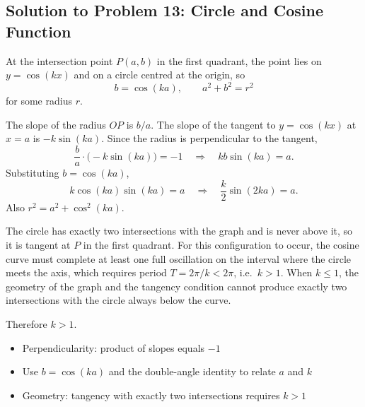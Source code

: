 \subsection{Solution to Problem 13: Circle and Cosine Function}

\begin{solution}
At the intersection point $P(a,b)$ in the first quadrant, the point lies on $y=\cos(kx)$ and on a circle centred at the origin, so
\[
b = \cos(ka), \qquad a^2 + b^2 = r^2
\]
for some radius $r$.

The slope of the radius $OP$ is $b/a$. The slope of the tangent to $y=\cos(kx)$ at $x=a$ is $-k\sin(ka)$. Since the radius is perpendicular to the tangent,
\[
\frac{b}{a}\cdot\bigl(-k\sin(ka)\bigr) = -1
\quad\Longrightarrow\quad
kb\sin(ka) = a.
\]
Substituting $b=\cos(ka)$,
\[
k\cos(ka)\sin(ka) = a
\quad\Longrightarrow\quad
\frac{k}{2}\sin(2ka) = a.
\]
Also $r^2 = a^2 + \cos^2(ka)$.

The circle has exactly two intersections with the graph and is never above it, so it is tangent at $P$ in the first quadrant. For this configuration to occur, the cosine curve must complete at least one full oscillation on the interval where the circle meets the axis, which requires period $T = 2\pi/k < 2\pi$, i.e.\ $k > 1$. When $k \le 1$, the geometry of the graph and the tangency condition cannot produce exactly two intersections with the circle always below the curve.

Therefore $k > 1$.
\end{solution}

\begin{takeaways}
\begin{itemize}
    \item Perpendicularity: product of slopes equals $-1$
    \item Use $b=\cos(ka)$ and the double-angle identity to relate $a$ and $k$
    \item Geometry: tangency with exactly two intersections requires $k>1$
\end{itemize}
\end{takeaways}
